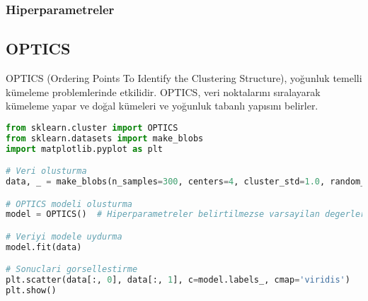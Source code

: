 \subsubsection{Hiperparametreler}
\begin{table}[h]
\centering
{\scriptsize\renewcommand{\arraystretch}{0.4}
{}}
\end{table}

\subsection{OPTICS}
OPTICS (Ordering Points To Identify the Clustering Structure), yoğunluk temelli kümeleme problemlerinde etkilidir. OPTICS, veri noktalarını sıralayarak kümeleme yapar ve doğal kümeleri ve yoğunluk tabanlı yapısını belirler.

\begin{lstlisting}[language=Python, caption=Scikit-learn'de OPTICS örneği.]
from sklearn.cluster import OPTICS
from sklearn.datasets import make_blobs
import matplotlib.pyplot as plt

# Veri olusturma
data, _ = make_blobs(n_samples=300, centers=4, cluster_std=1.0, random_state=42)

# OPTICS modeli olusturma
model = OPTICS()  # Hiperparametreler belirtilmezse varsayilan degerler kullanilir.

# Veriyi modele uydurma
model.fit(data)

# Sonuclari gorsellestirme
plt.scatter(data[:, 0], data[:, 1], c=model.labels_, cmap='viridis')
plt.show()
\end{lstlisting}

